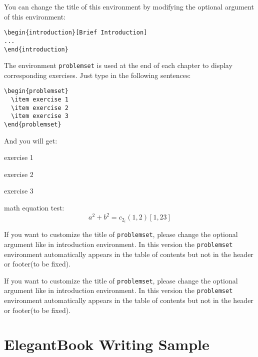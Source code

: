 You can change the title of this environment by modifying the optional argument of this environment:
\begin{lstlisting}
\begin{introduction}[Brief Introduction]
...
\end{introduction}
\end{lstlisting}

The environment \lstinline{problemset} is used at the end of each chapter to display corresponding exercises. Just type in the following sentences:
\begin{lstlisting}
\begin{problemset}
  \item exercise 1
  \item exercise 2
  \item exercise 3
\end{problemset}
\end{lstlisting}
And you will get:
\begin{problemset}
    \item exercise 1
    \item exercise 2
    \item exercise 3
    \item math equation test:
    \begin{equation}
        a^2+b^2=c_{2_{i}} (1,2) [1,23]
    \end{equation}
\end{problemset}
\begin{remark}
    If you want to customize the title of \lstinline{problemset}, please change the optional argument like in introduction environment. In this version the \lstinline{problemset} environment automatically appears in the table of contents but not in the header or footer(to be fixed).
\end{remark}

\begin{solution}
    If you want to customize the title of \lstinline{problemset}, please change the optional argument like in introduction environment. In this version the \lstinline{problemset} environment automatically appears in the table of contents but not in the header or footer(to be fixed).
\end{solution}

\chapter{ElegantBook Writing Sample}

